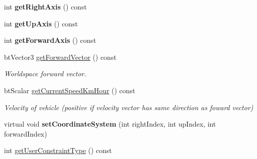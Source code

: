 \begin{DoxyCompactItemize}
\item 
\hypertarget{classbt_raycast_vehicle_ae6ffb939577b6b9597b5fa70780fef09}{int {\bfseries get\+Right\+Axis} () const }\label{classbt_raycast_vehicle_ae6ffb939577b6b9597b5fa70780fef09}

\item 
\hypertarget{classbt_raycast_vehicle_a37369f44a53a0fd6df22d38c2f4ff21f}{int {\bfseries get\+Up\+Axis} () const }\label{classbt_raycast_vehicle_a37369f44a53a0fd6df22d38c2f4ff21f}

\item 
\hypertarget{classbt_raycast_vehicle_aa356308e0b07304d347a7bc6aae99e95}{int {\bfseries get\+Forward\+Axis} () const }\label{classbt_raycast_vehicle_aa356308e0b07304d347a7bc6aae99e95}

\item 
\hypertarget{classbt_raycast_vehicle_a2aaaf0cc32e2f636b898b1856eb84fda}{bt\+Vector3 \hyperlink{classbt_raycast_vehicle_a2aaaf0cc32e2f636b898b1856eb84fda}{get\+Forward\+Vector} () const }\label{classbt_raycast_vehicle_a2aaaf0cc32e2f636b898b1856eb84fda}

\begin{DoxyCompactList}\small\item\em Worldspace forward vector. \end{DoxyCompactList}\item 
\hypertarget{classbt_raycast_vehicle_a8db5fe1a6b3b36f144cc7a14f59e1c1e}{bt\+Scalar \hyperlink{classbt_raycast_vehicle_a8db5fe1a6b3b36f144cc7a14f59e1c1e}{get\+Current\+Speed\+Km\+Hour} () const }\label{classbt_raycast_vehicle_a8db5fe1a6b3b36f144cc7a14f59e1c1e}

\begin{DoxyCompactList}\small\item\em Velocity of vehicle (positive if velocity vector has same direction as foward vector) \end{DoxyCompactList}\item 
\hypertarget{classbt_raycast_vehicle_a505882e9089229da3cea15e6af922a0f}{virtual void {\bfseries set\+Coordinate\+System} (int right\+Index, int up\+Index, int forward\+Index)}\label{classbt_raycast_vehicle_a505882e9089229da3cea15e6af922a0f}

\item 
\hypertarget{classbt_raycast_vehicle_a6e6ae8ff0a356616fc73f5a558d9b1c1}{int \hyperlink{classbt_raycast_vehicle_a6e6ae8ff0a356616fc73f5a558d9b1c1}{get\+User\+Constraint\+Type} () const }\label{classbt_raycast_vehicle_a6e6ae8ff0a356616fc73f5a558d9b1c1}


\end{DoxyCompactItemize}

